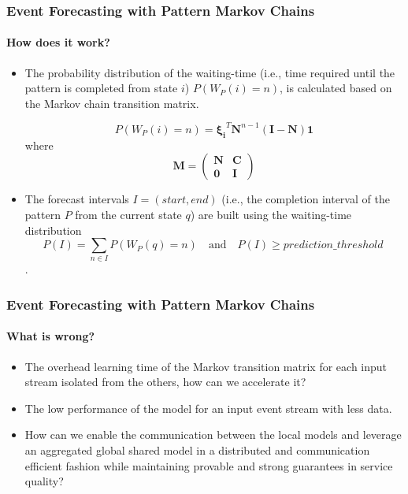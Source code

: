\frame
{
	\frametitle{Event Forecasting with Pattern Markov
		Chains}
	\framesubtitle{How does it work?}
	\begin{itemize}
		
		\item<only@1> The probability distribution of the waiting-time (i.e., time required until the pattern is completed from state $i$) $P(W_{P}(i)=n)$, is calculated based on the Markov chain transition matrix. 
	
		\begin{equation*}
		P(W_{P}(i)=n)=\boldsymbol{\xi_{i}}^{T}\boldsymbol{N}^{n-1}(\boldsymbol{I}-\boldsymbol{N})\boldsymbol{1} 
		\end{equation*}
		where 
		\begin{equation}
		\label{eq:matrix}
		\boldsymbol{M} = 
		\begin{pmatrix} 
		\boldsymbol{N} & \boldsymbol{C}  \\ 
		\boldsymbol{0} & \boldsymbol{I}
		\end{pmatrix}
		\end{equation}
		\item<only@1> The forecast intervals $I=(start,end)$ (i.e., the completion interval of the pattern $P$ from the  current state $q$) are built using the waiting-time distribution $$P(I)=\sum_{n \in I}{P(W_{P}(q)=n)} \quad \textrm{and} \quad P(I) \geq \mathit{prediction \_ threshold}\ $$. 
			
	\end{itemize}
}



\frame
{
	\frametitle{Event Forecasting with Pattern Markov
		Chains}
	\framesubtitle{What is wrong?}
	\begin{itemize}
		
		\item<only@1> The overhead learning time of the Markov transition matrix for each input stream isolated from the others, how can we accelerate it?  
		 
		\item<only@1> The low performance of the model for an input event stream with less data. 
		
			\item<only@1> How can we enable the communication between the local models 
			 and leverage an aggregated global shared model in 
		 	a distributed and communication efficient fashion while maintaining
			provable and strong guarantees in service quality?
			
	
	\end{itemize}
}
